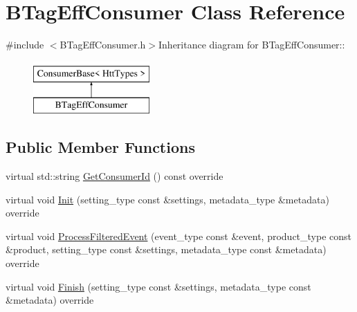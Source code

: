 \hypertarget{classBTagEffConsumer}{
\section{BTagEffConsumer Class Reference}
\label{classBTagEffConsumer}
}


{\ttfamily \#include $<$BTagEffConsumer.h$>$}Inheritance diagram for BTagEffConsumer::\begin{figure}[H]
\begin{center}
\leavevmode
\includegraphics[height=2cm]{classBTagEffConsumer}
\end{center}
\end{figure}
\subsection*{Public Member Functions}
\begin{DoxyCompactItemize}
\item 
virtual std::string \hyperlink{classBTagEffConsumer_aed32021cd9770c3d476e402d79255696}{GetConsumerId} () const override
\item 
virtual void \hyperlink{classBTagEffConsumer_af3b5e34c1c6fe81ca9da43b2c3a202e7}{Init} (setting\_\-type const \&settings, metadata\_\-type \&metadata) override
\item 
virtual void \hyperlink{classBTagEffConsumer_a000e908dedb6295a01011da52ecf178e}{ProcessFilteredEvent} (event\_\-type const \&event, product\_\-type const \&product, setting\_\-type const \&settings, metadata\_\-type const \&metadata) override
\item 
virtual void \hyperlink{classBTagEffConsumer_ab6c08026612b755cfc280c80e74b2fcf}{Finish} (setting\_\-type const \&settings, metadata\_\-type const \&metadata) override
\end{DoxyCompactItemize}


